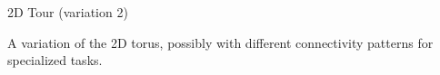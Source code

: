 \documentclass[a4paper, 10pt]{book}
\begin{document}
                    \vspace{0.3cm}
                    \noindent
                    \begin{minipage}{1\linewidth}
                        \begin{tcolorbox}[colframe=black!50, colback=white, size=small]
                            
                            {\bold 2D Tour (variation 2)}
                            
                            A variation of the 2D torus, possibly with different connectivity patterns for specialized tasks.

                            \begin{center}
                                \begin{tikzpicture}

                                    
                                    
                                \end{tikzpicture}
                            \end{center}

                        \end{tcolorbox}
                    \end{minipage}
\end{document}
